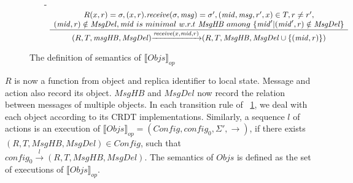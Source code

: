 \begin{figure}[ht]
\begin{itemize}
\item[-] $\begin{array}{l c}
   \bigfrac{
   \begin{array}{c}
      R(x,r) = \sigma, (x,r).\mathit{receive}(\sigma,\mathit{msg}) = \sigma', (\mathit{mid},\mathit{msg},r',x) \in T, r \neq r', \\
      (\mathit{mid},r) \notin \mathit{MsgDel}, \mathit{mid} \ is \ minimal \ w.r.t \ \mathit{MsgHB} \ among \ \{ \mathit{mid}' \vert (\mathit{mid}',r) \notin \mathit{MsgDel} \}
   \end{array}}
     {(R,T,\mathit{msgHB},\mathit{MsgDel}) {\xrightarrow{\mathit{receive}(x,\mathit{mid},r)}} (R,T,\mathit{MsgHB},\mathit{MsgDel} \cup \{ (\mathit{mid},r) \} )}
\end{array}$
\end{itemize}
\caption{The definition of semantics of $\llbracket \mathit{Objs} \rrbracket_{\mathit{op}}$}
\label{fig:the semantics of multiple operation-based CRDT object}
\end{figure} 




$R$ is now a function from object and replica identifier to local state. Message and action also record its object. $\mathit{MsgHB}$ and $\mathit{MsgDel}$ now record the relation between messages of multiple objects. In each transition rule of \figurename~\ref{fig:the semantics of multiple operation-based CRDT object}, we deal with each object according to its CRDT implementations. Similarly, a sequence $l$ of actions is an execution of $\llbracket \mathit{Objs} \rrbracket_{\mathit{op}} = (\mathit{Config},\mathit{config}_0,\Sigma',\rightarrow)$, if there exists $(R,T,\mathit{MsgHB},\mathit{MsgDel}) \in \mathit{Config}$, such that $\mathit{config}_0 {\xrightarrow{ l }} (R,T,\mathit{MsgHB},\mathit{MsgDel})$. The semantics of $\mathit{Objs}$ is defined as the set of executions of $\llbracket \mathit{Objs} \rrbracket_{\mathit{op}}$. 





